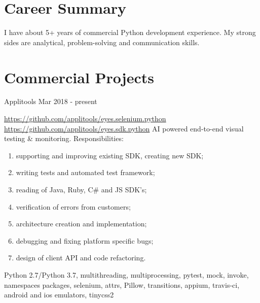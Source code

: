 \documentclass[11pt,a4paper]{moderncv}
\begin{document}
	\maketitle
	
	\section{Career Summary}
	\cvline
	{}
	{I have about 5+ years of commercial Python development experience. My strong sides are analytical, problem-solving and communication skills. \newline{}}


	\section{Commercial Projects}
	\cvline
	{Applitools Mar 2018 - present}
	{\url{https://github.com/applitools/eyes.selenium.python}\newline{}
	\url{https://github.com/applitools/eyes.sdk.python}\newline{}
	    AI powered end-to-end visual testing \& monitoring.\newline{}
        Responsibilities:
            \begin{enumerate}
                \item supporting and improving existing SDK, creating new SDK;
                \item writing tests and automated test framework;
                \item reading of Java, Ruby, C# and JS SDK's;
                \item verification of errors from customers;
                \item architecture creation and implementation;
                \item debugging and fixing platform specific bugs;
                \item design of client API and code refactoring.
            \end{enumerate}
		\newline{}\newline{}
		Python 2.7/Python 3.7, multithreading, multiprocessing, pytest, mock, invoke, namespaces packages, selenium, attrs, Pillow, transitions, appium, travis-ci, android and ios emulators, tinycss2}
\end{document}
